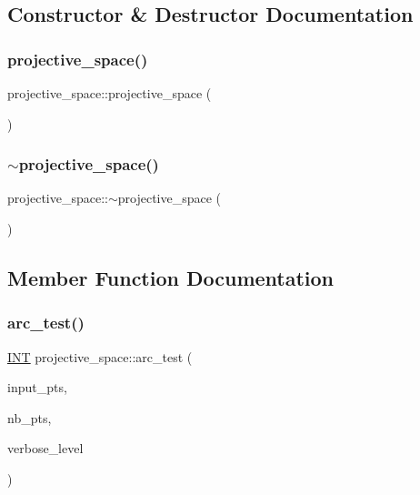 \subsection{Constructor \& Destructor Documentation}
\mbox{\label{classprojective__space_afc915202d40e4ee5ed3ace7412c5de09}} 
\subsubsection{\texorpdfstring{projective\+\_\+space()}{projective\_space()}}
{\footnotesize\ttfamily projective\+\_\+space\+::projective\+\_\+space (\begin{DoxyParamCaption}{ }\end{DoxyParamCaption})}

\mbox{\label{classprojective__space_acd0bc9e42e979091ca31bd9b98cccf3c}} 
\subsubsection{\texorpdfstring{$\sim$projective\+\_\+space()}{~projective\_space()}}
{\footnotesize\ttfamily projective\+\_\+space\+::$\sim$projective\+\_\+space (\begin{DoxyParamCaption}{ }\end{DoxyParamCaption})}



\subsection{Member Function Documentation}
\mbox{\label{classprojective__space_a065c2c15235080040332e0b5ea5b5a60}} 
\subsubsection{\texorpdfstring{arc\+\_\+test()}{arc\_test()}}
{\footnotesize\ttfamily \mbox{\hyperlink{galois_8h_a09fddde158a3a20bd2dcadb609de11dc}{I\+NT}} projective\+\_\+space\+::arc\+\_\+test (\begin{DoxyParamCaption}\item[{\mbox{\hyperlink{galois_8h_a09fddde158a3a20bd2dcadb609de11dc}{I\+NT}} $\ast$}]{input\+\_\+pts,  }\item[{\mbox{\hyperlink{galois_8h_a09fddde158a3a20bd2dcadb609de11dc}{I\+NT}}}]{nb\+\_\+pts,  }\item[{\mbox{\hyperlink{galois_8h_a09fddde158a3a20bd2dcadb609de11dc}{I\+NT}}}]{verbose\+\_\+level }\end{DoxyParamCaption})}

